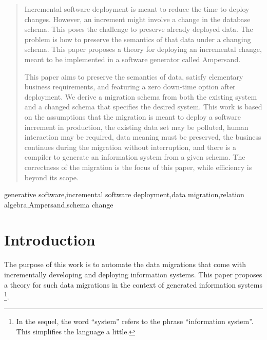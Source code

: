 \documentclass{elsarticle}
\begin{document}
\begin{abstract}
   Incremental software deployment is meant to reduce the time to deploy changes.
   However, an increment might involve a change in the database schema.
   This poses the challenge to preserve already deployed data.
   The problem is how to preserve the semantics of that data under a changing schema.
   This paper proposes a theory for deploying an incremental change,
   meant to be implemented in a software generator called Ampersand.
   
   This paper aims to preserve the semantics of data, satisfy elementary business requirements,
   and featuring a zero down-time option after deployment.
   We derive a migration schema from both the existing system and a changed schema that specifies the desired system.
   This work is based on the assumptions that
   the migration is meant to deploy a software increment in production,
   the existing data set may be polluted,
   human interaction may be required,
   data meaning must be preserved,
   the business continues during the migration without interruption,
   and there is a compiler to generate an information system from a given schema.
   The correctness of the migration is the focus of this paper, while efficiency is beyond its scope.
\end{abstract}

\begin{keyword}
generative software\sep incremental software deployment\sep data migration\sep relation algebra\sep Ampersand\sep schema change
\end{keyword}
\maketitle

\section{Introduction}
\label{sct:Introduction}
   The purpose of this work is to automate the data migrations that come with incrementally developing and deploying information systems.
   This paper proposes a theory for such data migrations in the context of generated information systems%
\footnote{In the sequel, the word ``system'' refers to the phrase ``information system''. This simplifies the language a little. }.
\end{document}
